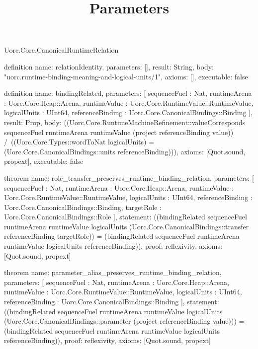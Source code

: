 \begin{lexlean}{Uorc.Core.CanonicalRuntimeRelation}
\title{Parameters}
\begin{semanticmodule}
definition{
  name: relationIdentity,
  parameters: [],
  result: String,
  body: "uorc.runtime-binding-meaning-and-logical-units/1",
  axioms: [],
  executable: false
}

definition{
  name: bindingRelated,
  parameters: [
    sequenceFuel : Nat,
    runtimeArena : Uorc.Core.Heap::Arena,
    runtimeValue : Uorc.Core.RuntimeValue::RuntimeValue,
    logicalUnits : UInt64,
    referenceBinding : Uorc.Core.CanonicalBindings::Binding
  ],
  result: Prop,
  body: ((Uorc.Core.RuntimeMachineRefinement::valueCorresponds sequenceFuel runtimeArena runtimeValue (project referenceBinding value)) /\ ((Uorc.Core.Types::wordToNat logicalUnits) = (Uorc.Core.CanonicalBindings::units referenceBinding))),
  axioms: [Quot.sound, propext],
  executable: false
}

theorem{
  name: role_transfer_preserves_runtime_binding_relation,
  parameters: [
    sequenceFuel : Nat,
    runtimeArena : Uorc.Core.Heap::Arena,
    runtimeValue : Uorc.Core.RuntimeValue::RuntimeValue,
    logicalUnits : UInt64,
    referenceBinding : Uorc.Core.CanonicalBindings::Binding,
    targetRole : Uorc.Core.CanonicalBindings::Role
  ],
  statement: ((bindingRelated sequenceFuel runtimeArena runtimeValue logicalUnits (Uorc.Core.CanonicalBindings::transfer referenceBinding targetRole)) = (bindingRelated sequenceFuel runtimeArena runtimeValue logicalUnits referenceBinding)),
  proof: reflexivity{},
  axioms: [Quot.sound, propext]
}

theorem{
  name: parameter_alias_preserves_runtime_binding_relation,
  parameters: [
    sequenceFuel : Nat,
    runtimeArena : Uorc.Core.Heap::Arena,
    runtimeValue : Uorc.Core.RuntimeValue::RuntimeValue,
    logicalUnits : UInt64,
    referenceBinding : Uorc.Core.CanonicalBindings::Binding
  ],
  statement: ((bindingRelated sequenceFuel runtimeArena runtimeValue logicalUnits (Uorc.Core.CanonicalBindings::parameter (project referenceBinding value))) = (bindingRelated sequenceFuel runtimeArena runtimeValue logicalUnits referenceBinding)),
  proof: reflexivity{},
  axioms: [Quot.sound, propext]
}


\end{semanticmodule}
\end{lexlean}
